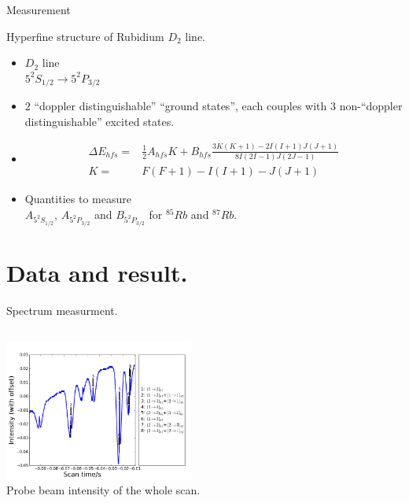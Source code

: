 \documentclass{beamer}
\def\timeleft{15:00->14:55}
\begin{document}
\def\timeleft{7:30 -> 4:00}
\begin{frame}{Measurement}
  \begin{block}{Hyperfine structure of Rubidium $D_2$ line.}
    \begin{itemize}[<+->]
    \item
      $D_2$ line\\
      $5^2S_{1/2}\rightarrow 5^2P_{3/2}$
    \item
      $2$ ``doppler distinguishable'' ``ground states'', each couples with $3$ non-``doppler distinguishable'' excited states.
    \item
      \begin{align*}
        \Delta E_{hfs}=&\frac12A_{hfs}K+B_{hfs}\frac{3K(K + 1) - 2I(I + 1)J(J + 1)}{8I(2I - 1)J(2J - 1)}\\
        K=&F(F + 1) - I(I + 1) - J(J + 1)
      \end{align*}
    \item
      Quantities to measure\\
      $A_{5^2S_{1/2}}$, $A_{5^2P_{3/2}}$ and $B_{5^2P_{3/2}}$ for ${}^{85}Rb$ and ${}^{87}Rb$.
    \end{itemize}
  \end{block}
\end{frame}

\def\timeleft{4:00->3:00}
\section{Data and result.}
\begin{frame}{Spectrum measurment.}
  \begin{columns}
    \column{6cm}
    \includegraphics[width=6.2cm]{../all_data/4-18/20130418-14_12_48_probe.png}\\
    Probe beam intensity of the whole scan.
    \column{6cm}
  \end{columns}
\end{frame}
\end{document}
